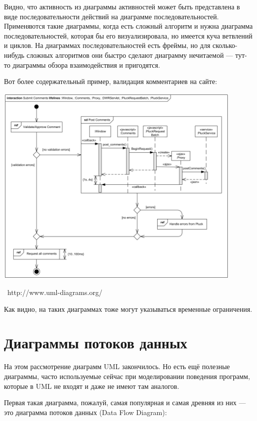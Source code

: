 \documentclass[a5paper]{article}
\newcommand{\attribution}[1] {
	\vspace{-5mm}\begin{flushright}\begin{scriptsize}%
	{\textcopyright\, #1}\end{scriptsize}\end{flushright}
}
\begin{document}
Видно, что активность из диаграммы активностей может быть представлена в виде последовательности действий на диаграмме последовательностей. Применяются такие диаграммы, когда есть сложный алгоритм и нужна диаграмма последовательностей, которая бы его визуализировала, но имеется куча ветвлений и циклов. На диаграммах последовательностей есть фреймы, но для сколько-нибудь сложных алгоритмов они быстро сделают диаграмму нечитаемой --- тут-то диаграммы обзора взаимодействия и пригодятся. 

Вот более содержательный пример, валидация комментариев на сайте:

\begin{center}
	\includegraphics[width=0.9\textwidth]{interactionOverviewExample.png}
	\attribution{http://www.uml-diagrams.org/}
\end{center}

Как видно, на таких диаграммах тоже могут указываться временные ограничения.

\section{Диаграммы потоков данных}

На этом рассмотрение диаграмм UML закончилось. Но есть ещё полезные диаграммы, часто используемые сейчас при моделировании поведения программ, которые в UML не входят и даже не имеют там аналогов. 

Первая такая диаграмма, пожалуй, самая популярная и самая древняя из них --- это диаграмма потоков данных (Data Flow Diagram):
\end{document}
